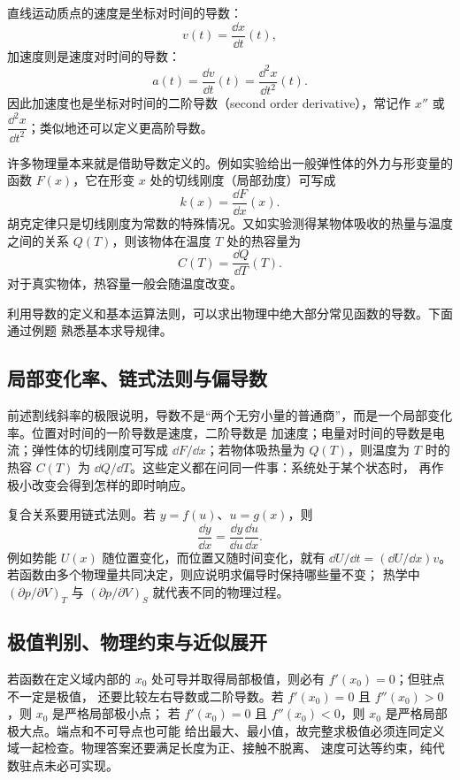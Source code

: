 {直线运动质点的速度是坐标对时间的导数：
\begin{equation}
 v(t)=\frac{\dd x}{\dd t}(t),
\end{equation}
加速度则是速度对时间的导数：
\begin{equation}
 a(t)=\frac{\dd v}{\dd t}(t)=\frac{\dd^2x}{\dd t^2}(t).
\end{equation}
因此加速度也是坐标对时间的二阶导数（second order derivative），常记作 $x''$ 或
$\dfrac{\dd^2x}{\dd t^2}$；类似地还可以定义更高阶导数。

许多物理量本来就是借助导数定义的。例如实验给出一般弹性体的外力与形变量的函数
$F(x)$，它在形变 $x$ 处的切线刚度（局部劲度）可写成
\begin{equation}
 k(x)=\frac{\dd F}{\dd x}(x).
\end{equation}
胡克定律只是切线刚度为常数的特殊情况。又如实验测得某物体吸收的热量与温度之间的关系
$Q(T)$，则该物体在温度 $T$ 处的热容量为
\begin{equation}
 C(T)=\frac{\dd Q}{\dd T}(T).
\end{equation}
对于真实物体，热容量一般会随温度改变。

利用导数的定义和基本运算法则，可以求出物理中绝大部分常见函数的导数。下面通过例题
熟悉基本求导规律。

\subsection{局部变化率、链式法则与偏导数}

前述割线斜率的极限说明，导数不是“两个无穷小量的普通商”，而是一个局部变化率。位置对时间的一阶导数是速度，二阶导数是
加速度；电量对时间的导数是电流；弹性体的切线刚度可写成 $\dd F/\dd x$；若物体吸热量为
$Q(T)$，则温度为 $T$ 时的热容 $C(T)$ 为 $\dd Q/\dd T$。这些定义都在问同一件事：系统处于某个状态时，
再作极小改变会得到怎样的即时响应。

复合关系要用链式法则。若 $y=f(u)$、$u=g(x)$，则
\[
 \frac{\dd y}{\dd x}=\frac{\dd y}{\dd u}\frac{\dd u}{\dd x}.
\]
例如势能 $U(x)$ 随位置变化，而位置又随时间变化，就有
$\dd U/\dd t=(\dd U/\dd x)v$。若函数由多个物理量共同决定，则应说明求偏导时保持哪些量不变；
热学中 $(\partial p/\partial V)_T$ 与 $(\partial p/\partial V)_S$ 就代表不同的物理过程。

\subsection{极值判别、物理约束与近似展开}

若函数在定义域内部的 $x_0$ 处可导并取得局部极值，则必有 $f'(x_0)=0$；但驻点不一定是极值，
还要比较左右导数或二阶导数。若 $f'(x_0)=0$ 且 $f''(x_0)>0$，则 $x_0$ 是严格局部极小点；
若 $f'(x_0)=0$ 且 $f''(x_0)<0$，则 $x_0$ 是严格局部极大点。端点和不可导点也可能
给出最大、最小值，故完整求极值必须连同定义域一起检查。物理答案还要满足长度为正、接触不脱离、
速度可达等约束，纯代数驻点未必可实现。

}
